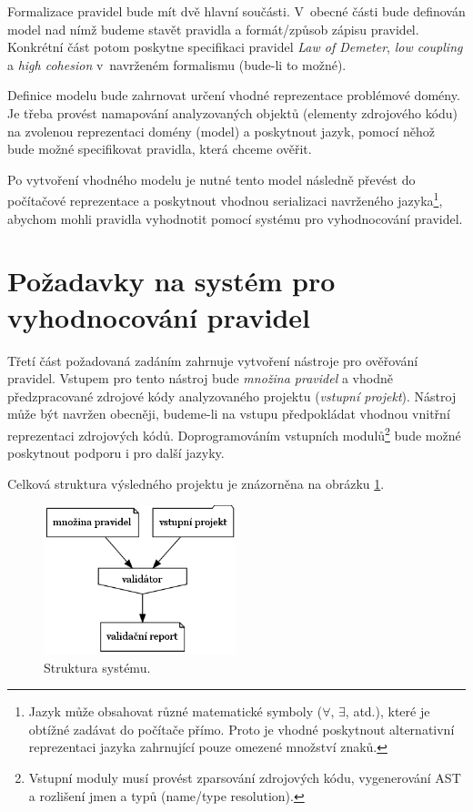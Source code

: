 Formalizace pravidel bude mít dvě hlavní součásti. V~obecné části bude definován model nad nímž budeme stavět pravidla a formát/způsob zápisu pravidel. Konkrétní část potom poskytne specifikaci pravidel \emph{Law of Demeter}, \emph{low coupling} a \emph{high cohesion} v~navrženém formalismu (bude-li to možné).

Definice modelu bude zahrnovat určení vhodné reprezentace problémové domény. Je třeba provést namapování analyzovaných objektů (elementy zdrojového kódu) na zvolenou reprezentaci domény (model) a poskytnout jazyk, pomocí něhož bude možné specifikovat pravidla, která chceme ověřit.

Po vytvoření vhodného modelu je nutné tento model následně převést do počítačové reprezentace a poskytnout vhodnou serializaci navrženého jazyka\footnote{Jazyk může obsahovat různé matematické symboly ($\forall$, $\exists$, atd.), které je obtížné zadávat do počítače přímo. Proto je vhodné poskytnout alternativní reprezentaci jazyka zahrnující pouze omezené množství znaků.}, abychom mohli pravidla vyhodnotit pomocí systému pro vyhodnocování pravidel.

\section{Požadavky na systém pro vyhodnocování pravidel}
\label{requirements-rules_evaluation}
Třetí část požadovaná zadáním zahrnuje vytvoření nástroje pro ověřování pravidel. Vstupem pro tento nástroj bude \emph{množina pravidel} a vhodně předzpracované zdrojové kódy analyzovaného projektu (\emph{vstupní projekt}). Nástroj může být navržen obecněji, budeme-li na vstupu předpokládat vhodnou vnitřní reprezentaci zdrojových kódů. Doprogramováním vstupních modulů\footnote{Vstupní moduly musí provést zparsování zdrojových kódu, vygenerování AST a rozlišení jmen a typů (name/type resolution).} bude možné poskytnout podporu i pro další jazyky.

Celková struktura výsledného projektu je znázorněna na obrázku \ref{requirements-system_structure}.

\begin{figure}[h!]
  \centering
  \includegraphics[width=0.5\textwidth]{./graphs/global_structure.png}
  \caption{Struktura systému.\label{requirements-system_structure}}
\end{figure}

